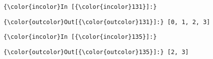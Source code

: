 \documentclass[11pt]{article}
\begin{document}
    \begin{Verbatim}[commandchars=\\\{\}]
{\color{incolor}In [{\color{incolor}131}]:} 
\end{Verbatim}


\begin{Verbatim}[commandchars=\\\{\}]
{\color{outcolor}Out[{\color{outcolor}131}]:} [0, 1, 2, 3]
\end{Verbatim}
            
    \begin{Verbatim}[commandchars=\\\{\}]
{\color{incolor}In [{\color{incolor}135}]:} 
\end{Verbatim}


\begin{Verbatim}[commandchars=\\\{\}]
{\color{outcolor}Out[{\color{outcolor}135}]:} [2, 3]
\end{Verbatim}
            

    
    
    
    
\end{document}
